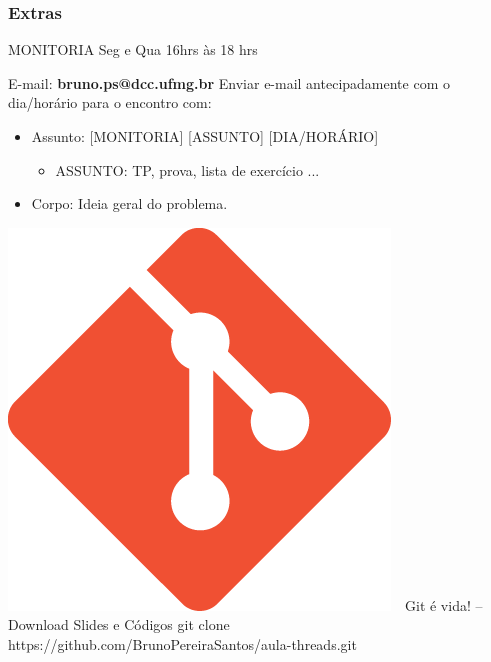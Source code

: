 \documentclass[10pt, xcolor=x11names]{beamer}
\newcommand\Fontvi{\fontsize{8}{7.2}\selectfont}
\begin{document}
\begin{frame}\frametitle{Extras}
	\begin{exampleblock}{MONITORIA}
		Seg e Qua 16hrs às 18 hrs
	\end{exampleblock}
	
	\begin{alertblock}{E-mail: \textbf{bruno.ps@dcc.ufmg.br}}
		Enviar e-mail antecipadamente com o dia/horário para o encontro com:
		\begin{itemize}
		 	\item Assunto: [MONITORIA] [ASSUNTO] [DIA/HORÁRIO]
		 		\begin{itemize}
		 			\item ASSUNTO: TP, prova, lista de exercício ...
		 		\end{itemize}
		 	\item Corpo: Ideia geral do problema.
		\end{itemize} 
	\end{alertblock}

	\begin{block}{\includegraphics[width=0.035 \linewidth]{img/git.png}~~Git é vida! -- Download Slides e Códigos}
		git clone https://github.com/BrunoPereiraSantos/aula-threads.git
	\end{block}

\end{frame}


\begin{frame}
	\Fontvi
	\nocite{*}
	
	
\end{frame}
\end{document}
